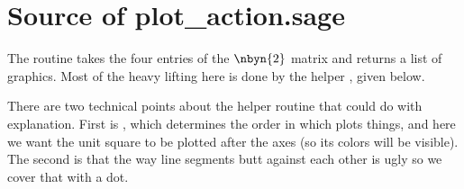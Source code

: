 \section{Source of plot\_action.sage}
The 
routine takes the four entries of the $\nbyn{2}$
matrix and returns a list of graphics.
Most of the heavy lifting here
is done by the helper , 
given below.


There are two technical points about the helper routine that could do with 
explanation. 
First is , which determines the order in which 
\Sage{} plots things, and here we want the unit square to be plotted
after the axes (so its colors will be visible).
The second is that the way line segments butt against each other is ugly 
so we cover that with a dot.



\endinput


TODO:
